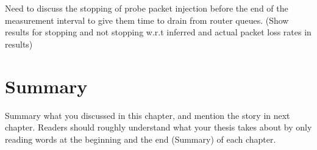 Need to discuss the stopping of probe packet injection before the end of the measurement interval to give them time to drain from router queues. (Show results for stopping and not stopping w.r.t inferred and actual packet loss rates in results)


\section{Summary}

Summary what you discussed in this chapter, and mention the story in next
chapter. Readers should roughly understand what your thesis takes about by only reading
words at the beginning and the end (Summary) of each chapter.
